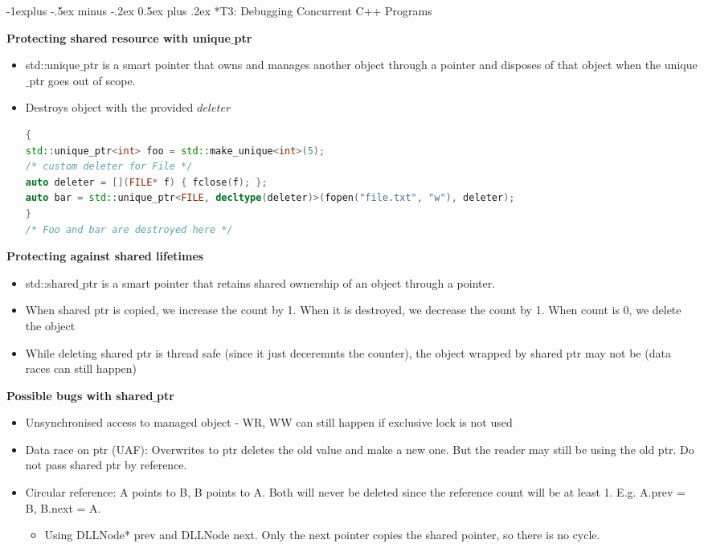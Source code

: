 \documentclass[10pt, landscape]{article}
\makeatletter
\renewcommand{\subsection}{\@startsection{subsection}{2}{0mm}%
                                {-1explus -.5ex minus -.2ex}%
                                {0.5ex plus .2ex}%
                                {\normalfont\normalsize\bfseries}}
\makeatother
\begin{document}
\begin{multicols}{4}
\subsection*{T3: Debugging Concurrent C++ Programs}

\textbf{Protecting shared resource with unique$\_$ptr} \\
\begin{itemize}
    \item std::unique$\_$ptr is a smart pointer that owns and manages another object through a pointer and disposes of that object when the unique$\_$ptr goes out of scope.
    \item Destroys object with the provided $deleter$
    \begin{lstlisting}[language=C++, breaklines=true, breakatwhitespace=true]
{ 
std::unique_ptr<int> foo = std::make_unique<int>(5);
/* custom deleter for File */
auto deleter = [](FILE* f) { fclose(f); };
auto bar = std::unique_ptr<FILE, decltype(deleter)>(fopen("file.txt", "w"), deleter);
}
/* Foo and bar are destroyed here */
    \end{lstlisting}
\end{itemize}

\textbf{Protecting against shared lifetimes} \\
\begin{itemize}
    \item std::shared$\_$ptr is a smart pointer that retains shared ownership of an object through a pointer.
    \item When shared ptr is copied, we increase the count by 1. When it is destroyed, we decrease the count by 1. When count is 0, we delete the object
    \item While deleting shared ptr is thread safe (since it just deceremnts the counter), the object wrapped by shared ptr may not be (data races can still happen)
\end{itemize}

\textbf{Possible bugs with shared$\_$ptr} \\
\begin{itemize}
    \item Unsynchronised access to managed object - WR, WW can still happen if exclusive lock is not used 
    \item Data race on ptr (UAF): Overwrites to ptr deletes the old value and make a new one. But the reader may still be using the old ptr. Do not pass shared ptr by reference. 
    \item Circular reference: A points to B, B points to A. Both will never be deleted since the reference count will be at least 1. E.g. A.prev = B, B.next = A. 
    \begin{itemize}
        \item Using DLLNode* prev and DLLNode next. Only the next pointer copies the shared pointer, so there is no cycle.
    \end{itemize}
\end{itemize}


\end{multicols}
\end{document}
